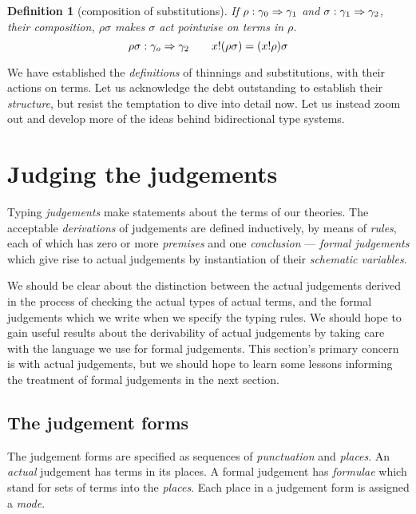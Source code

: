 \documentclass{jfp1}
\newtheorem{definition}[theorem]{Definition}
\begin{document}
\begin{definition}[composition of substitutions]
  If $\rho : \gamma_0\Rightarrow\gamma_1$ and $\sigma : \gamma_1\Rightarrow\gamma_2$, their
  composition, $\rho\sigma$ makes $\sigma$ act \emph{pointwise} on terms in $\rho$.
  \[\rho\sigma : \gamma_o\Rightarrow\gamma_2\qquad x!(\rho\sigma) =
    (x!\rho)\sigma
  \]
\end{definition}

We have established the \emph{definitions} of thinnings and
substitutions, with their actions on terms. Let us acknowledge the
debt outstanding to establish their \emph{structure}, but resist the
temptation to dive into detail now. Let us instead zoom out and
develop more of the ideas behind bidirectional type systems.



\section{Judging the judgements}

Typing \emph{judgements} make statements about the terms of our
theories. The acceptable \emph{derivations} of judgements are defined
inductively, by means of \emph{rules}, each of which has zero or
more \emph{premises} and one \emph{conclusion} ---
\emph{formal judgements} which give rise to actual judgements by
instantiation of their \emph{schematic variables}.

We should be clear about the distinction between the actual judgements
derived in the process of checking the actual types of actual terms,
and the formal judgements which we write when we specify the typing
rules. We should hope to gain useful results about the derivability
of actual judgements by taking care with the language we use for
formal judgements. This section's primary concern is with actual
judgements, but we should hope to learn some lessons informing
the treatment of formal judgements in the next section.


\subsection{The judgement forms}

The judgement forms are specified as sequences of \emph{punctuation}
and \emph{places}. An \emph{actual} judgement has terms in its places.
A formal judgement has \emph{formulae} which stand for sets of terms into the
\emph{places}. Each place in a judgement form is assigned a \emph{mode}.
\end{document}

